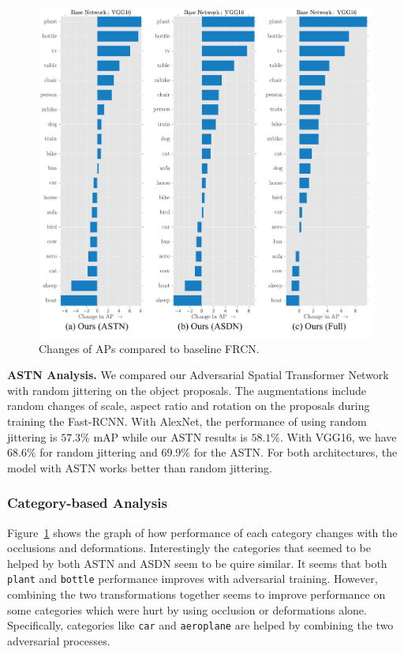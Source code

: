 \begin{figure}
    \centering
    \includegraphics[width=0.95\linewidth]{exp_ap.pdf}
    \vspace{-0.1in}
    \caption{Changes of APs compared to baseline FRCN.}\label{fig:exp_ap}
    \vspace{-0.1in}
\end{figure}
\textbf{ASTN Analysis.} We compared our Adversarial Spatial Transformer Network with random jittering on the object proposals. The augmentations include random changes of scale, aspect ratio and rotation on the proposals during training the Fast-RCNN. With AlexNet, the performance of using random jittering is $57.3\%$ mAP while our ASTN results is $58.1\%$. With VGG16, we have $68.6\%$ for random jittering and $69.9\%$ for the ASTN. For both architectures, the model with ASTN works better than random jittering. 



\vspace{-0.1in}
\subsubsection{Category-based Analysis}
\vspace{-0.05in}
Figure~\ref{fig:exp_ap} shows the graph of how performance of each category changes with the occlusions and deformations. Interestingly the categories that seemed to be helped by both ASTN and ASDN seem to be quire similar. It seems that both {\tt plant} and {\tt bottle} performance improves with adversarial training. However, combining the two transformations together seems to improve performance on some categories which were hurt by using occlusion or deformations alone. Specifically, categories like {\tt car} and {\tt aeroplane} are helped by combining the two adversarial processes.



